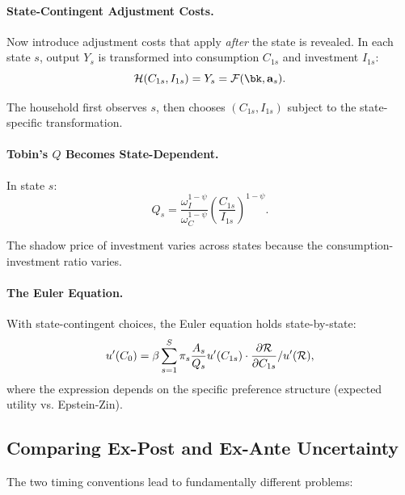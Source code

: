 \paragraph{State-Contingent Adjustment Costs.}
Now introduce adjustment costs that apply \emph{after} the state is revealed. In each state $s$, output $Y_s$ is transformed into consumption $C_{1s}$ and investment $I_{1s}$:
\begin{equation}
\Hfun(C_{1s}, I_{1s}) = Y_s = \F(\bk, \ba_s).
\label{eq:ac-risk-H-state}
\end{equation}

The household first observes $s$, then chooses $(C_{1s}, I_{1s})$ subject to the state-specific transformation.

\paragraph{Tobin's $Q$ Becomes State-Dependent.}
In state $s$:
\begin{equation}
Q_s = \frac{\omega_I^{1-\psi}}{\omega_C^{1-\psi}} \left( \frac{C_{1s}}{I_{1s}} \right)^{1-\psi}.
\label{eq:ac-risk-Qs}
\end{equation}

The shadow price of investment varies across states because the consumption-investment ratio varies.

\paragraph{The Euler Equation.}
With state-contingent choices, the Euler equation holds state-by-state:
\begin{equation}
u'(C_0) = \beta \sum_{s=1}^{S} \pi_s \frac{A_s}{Q_s} u'(C_{1s}) \cdot \frac{\partial \mathcal{R}}{\partial C_{1s}} / u'(\mathcal{R}),
\label{eq:ac-risk-euler-states}
\end{equation}
where the expression depends on the specific preference structure (expected utility vs. Epstein-Zin).

\subsection{Comparing Ex-Post and Ex-Ante Uncertainty}
\label{subsec:ac-risk-comparison}

The two timing conventions lead to fundamentally different problems:


